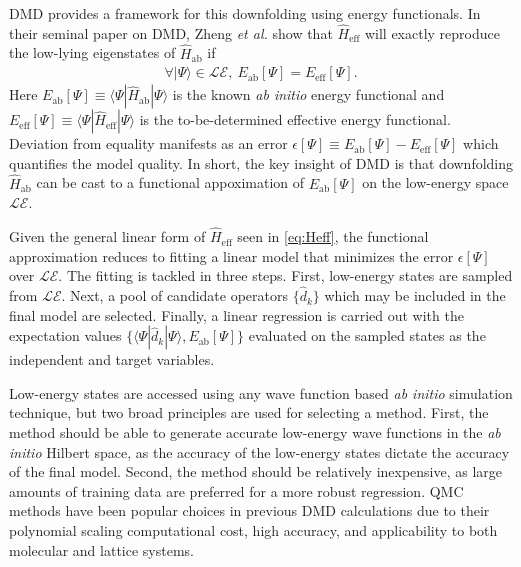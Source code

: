 \documentclass[12pt]{article}
\begin{document}
DMD provides a framework for this downfolding using energy functionals.
In their seminal paper on DMD, Zheng \textit{et al.} \cite{Zheng2017} show that $\hat{H}_\text{eff}$ will exactly reproduce the low-lying eigenstates of $\hat{H}_\text{ab}$ if
\begin{equation}
\begin{split}
\forall |\Psi\rangle \in \mathcal{LE},\ E_\text{ab}[\Psi] = E_\text{eff}[\Psi].
\end{split}
\label{eq:DMD}
\end{equation}
Here $E_\text{ab}[\Psi] \equiv \langle \Psi | \hat{H}_\text{ab} | \Psi \rangle$ is the known \textit{ab initio} energy functional and $E_\text{eff}[\Psi] \equiv \langle \Psi | \hat{H}_\text{eff} | \Psi \rangle$ is the to-be-determined effective energy functional.
Deviation from equality manifests as an error $\epsilon[\Psi] \equiv E_\text{ab}[\Psi] - E_\text{eff}[\Psi]$ which quantifies the model quality.
In short, the key insight of DMD is that downfolding $\hat{H}_\text{ab}$ can be cast to a functional appoximation of $E_\text{ab}[\Psi]$ on the low-energy space $\mathcal{LE}$.

Given the general linear form of $\hat{H}_\text{eff}$ seen in \eqref{eq:Heff}, 
the functional approximation reduces to fitting a linear model that minimizes the error $\epsilon[\Psi]$ over $\mathcal{LE}$.
The fitting is tackled in three steps.
First, low-energy states are sampled from $\mathcal{LE}$.
Next, a pool of candidate operators $\{\hat{d}_k\}$ which may be included in the final model are selected.
Finally, a linear regression is carried out with the expectation values $\{\langle \Psi | \hat{d}_k|\Psi \rangle, E_\text{ab}[\Psi] \}$  evaluated on the sampled states as the independent and target variables.

Low-energy states are accessed using any wave function based \textit{ab initio} simulation technique, but two broad principles are used for selecting a method.
First, the method should be able to generate accurate low-energy wave functions in the \textit{ab initio} Hilbert space, as the accuracy of the low-energy states dictate the accuracy of the final model.
Second, the method should be relatively inexpensive, as large amounts of training data are preferred for a more robust regression.
QMC methods have been popular choices in previous DMD calculations \cite{Zheng2017, Wagner2015} due to their polynomial scaling computational cost, high accuracy, and applicability to both molecular and lattice systems.
\end{document}
